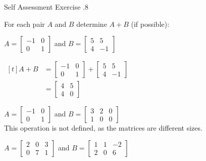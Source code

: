 \documentclass[\main/notes.tex]{subfiles}
\begin{document}
				\begin{exercise}{Self Assessment Exercise \thechapter.8}
					\begin{questions}
						\item For each pair $A$ and $B$ determine $A + B$ (if possible):
						\begin{multicols}{2}
							\begin{questions}
								\item $A = \begin{bmatrix}-1 & 0\\ 0 & 1\end{bmatrix}$ and $B = \begin{bmatrix}5 & 5 \\ 4 & -1\end{bmatrix}$\\
									\begin{answer}
										$ \begin{aligned}[t]
											A + B &= \begin{bmatrix}
												-1 & 0 \\ 0 & 1
											\end{bmatrix} + \begin{bmatrix}
												5 & 5 \\ 4 & -1
											\end{bmatrix}\\
											&= \begin{bmatrix}
												4 & 5\\ 4 & 0
											\end{bmatrix}
										\end{aligned} $
									\end{answer}
								\item $A = \begin{bmatrix}-1 & 0\\ 0 & 1\end{bmatrix}$ and $B = \begin{bmatrix}3 & 2 & 0 \\ 1 & 0 & 0\end{bmatrix}$\\
									{\answer This operation is not defined, as the matrices are different sizes.}
								\item $A = \begin{bmatrix}2 & 0 & 3\\ 0 & 7 & 1\end{bmatrix}$ and $B = \begin{bmatrix}1 & 1 & -2 \\ 2 & 0 & 6\end{bmatrix}$\\

\end{questions}
\end{multicols}
\end{questions}
\end{exercise}
\end{document}
